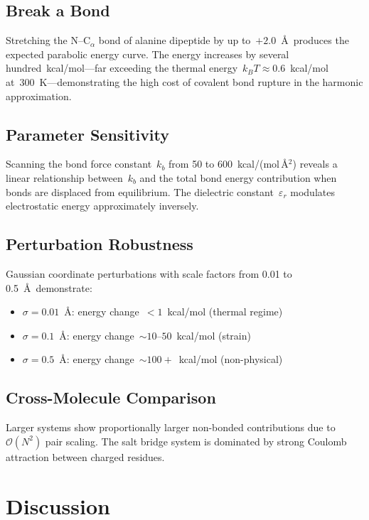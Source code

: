 \documentclass[conference]{IEEEtran}
\begin{document}
\subsection{Break a Bond}

Stretching the N--C$_\alpha$ bond of alanine dipeptide by up to~$+2.0$~\AA\
produces the expected parabolic energy curve.  The energy increases by several
hundred~kcal/mol---far exceeding the thermal energy~$k_BT \approx
0.6$~kcal/mol at~300~K---demonstrating the high cost of covalent bond rupture
in the harmonic approximation.

\subsection{Parameter Sensitivity}

Scanning the bond force constant~$k_b$ from 50 to
600~kcal/(mol\,\AA$^2$) reveals a linear relationship between~$k_b$ and the
total bond energy contribution when bonds are displaced from equilibrium.  The
dielectric constant~$\varepsilon_r$ modulates electrostatic energy
approximately inversely.

\subsection{Perturbation Robustness}

Gaussian coordinate perturbations with scale factors from 0.01 to 0.5~\AA\
demonstrate:
\begin{itemize}
    \item $\sigma = 0.01$~\AA: energy change~$< 1$~kcal/mol (thermal regime)
    \item $\sigma = 0.1$~\AA: energy change~$\sim 10$--$50$~kcal/mol (strain)
    \item $\sigma = 0.5$~\AA: energy change~$\sim 100+$~kcal/mol (non-physical)
\end{itemize}

\subsection{Cross-Molecule Comparison}

Larger systems show proportionally larger non-bonded contributions due to
$\mathcal{O}(N^2)$ pair scaling.  The salt bridge system is dominated by
strong Coulomb attraction between charged residues.

\section{Discussion}
\end{document}
